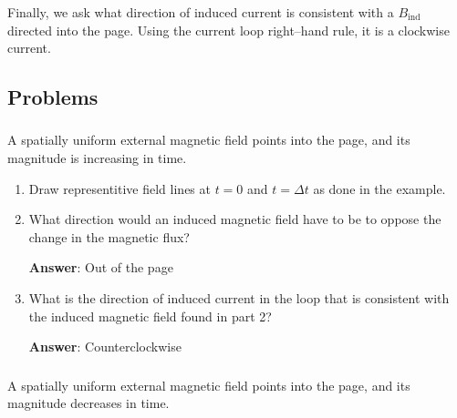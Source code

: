 \documentclass{article}
\begin{document}
Finally, we ask what direction of induced current is consistent with a $B_{\text{ind}}$ directed into the page. Using the current loop right--hand rule, it is a clockwise current.



\newpage

\subsection{Problems}

\subsubsection{}

A spatially uniform external magnetic field points into the page, and its magnitude is increasing in time.



\begin{enumerate}

  \item Draw representitive field lines at $t=0$ and $t=\Delta t$ as done in the example.

        \ifsolutions

        \else

        
        \fi

  \item What direction would an induced magnetic field have to be to oppose the change in the magnetic flux?

        \ifsolutions
        {\bf Answer}: Out of the page
        \else

        \fi

  \item What is the direction of induced current in the loop that is consistent with the induced magnetic field found in part 2?

        \ifsolutions
        {\bf Answer}: Counterclockwise
        \else

        \newpage
        \fi

\end{enumerate}

\subsubsection{}

A spatially uniform external magnetic field points into the page, and its magnitude decreases in time.
\end{document}
